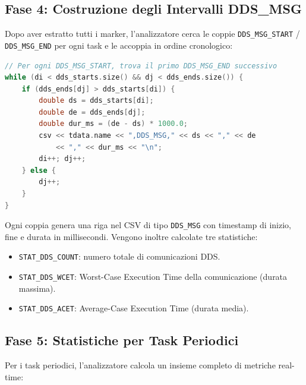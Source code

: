 \subsection{Fase 4: Costruzione degli Intervalli DDS\_MSG}
\label{subsec:dds_msg_intervals}

Dopo aver estratto tutti i marker, l'analizzatore cerca le coppie
\texttt{DDS\_MSG\_START} / \texttt{DDS\_MSG\_END} per ogni task e le
accoppia in ordine cronologico:

\begin{lstlisting}[language=C++, caption={Accoppiamento dei marker DDS\_MSG.}, label={lst:dds_pairing}]
// Per ogni DDS_MSG_START, trova il primo DDS_MSG_END successivo
while (di < dds_starts.size() && dj < dds_ends.size()) {
    if (dds_ends[dj] > dds_starts[di]) {
        double ds = dds_starts[di];
        double de = dds_ends[dj];
        double dur_ms = (de - ds) * 1000.0;
        csv << tdata.name << ",DDS_MSG," << ds << "," << de
            << "," << dur_ms << "\n";
        di++; dj++;
    } else {
        dj++;
    }
}
\end{lstlisting}

Ogni coppia genera una riga nel CSV di tipo \texttt{DDS\_MSG} con
timestamp di inizio, fine e durata in millisecondi. Vengono inoltre
calcolate tre statistiche:

\begin{itemize}
    \item \texttt{STAT\_DDS\_COUNT}: numero totale di comunicazioni DDS.
    \item \texttt{STAT\_DDS\_WCET}: Worst-Case Execution Time della
          comunicazione (durata massima).
    \item \texttt{STAT\_DDS\_ACET}: Average-Case Execution Time
          (durata media).
\end{itemize}

\subsection{Fase 5: Statistiche per Task Periodici}
\label{subsec:stats}

Per i task periodici, l'analizzatore calcola un insieme completo di
metriche real-time:

